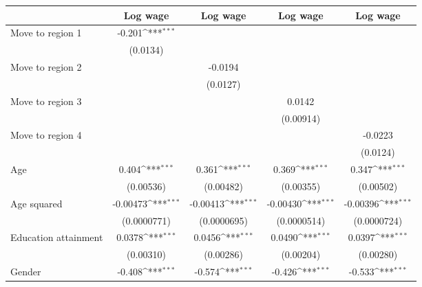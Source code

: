 {
\def\sym#1{\ifmmode^{#1}\else\(^{#1}\)\fi}
\begin{tabular*}{\textwidth}{@{\hskip\tabcolsep\extracolsep\fill}l*{4}{c}}
\toprule
                    &\multicolumn{1}{c}{Log wage}&\multicolumn{1}{c}{Log wage}&\multicolumn{1}{c}{Log wage}&\multicolumn{1}{c}{Log wage}\\
\midrule
Move to region 1    &      -0.201\sym{***}&                     &                     &                     \\
                    &    (0.0134)         &                     &                     &                     \\
\addlinespace
Move to region 2    &                     &     -0.0194         &                     &                     \\
                    &                     &    (0.0127)         &                     &                     \\
\addlinespace
Move to region 3    &                     &                     &      0.0142         &                     \\
                    &                     &                     &   (0.00914)         &                     \\
\addlinespace
Move to region 4    &                     &                     &                     &     -0.0223         \\
                    &                     &                     &                     &    (0.0124)         \\
\addlinespace
Age                 &       0.404\sym{***}&       0.361\sym{***}&       0.369\sym{***}&       0.347\sym{***}\\
                    &   (0.00536)         &   (0.00482)         &   (0.00355)         &   (0.00502)         \\
\addlinespace
Age squared         &    -0.00473\sym{***}&    -0.00413\sym{***}&    -0.00430\sym{***}&    -0.00396\sym{***}\\
                    & (0.0000771)         & (0.0000695)         & (0.0000514)         & (0.0000724)         \\
\addlinespace
Education attainment&      0.0378\sym{***}&      0.0456\sym{***}&      0.0490\sym{***}&      0.0397\sym{***}\\
                    &   (0.00310)         &   (0.00286)         &   (0.00204)         &   (0.00280)         \\
\addlinespace
Gender              &      -0.408\sym{***}&      -0.574\sym{***}&      -0.426\sym{***}&      -0.533\sym{***}\\

\end{tabular*}}
